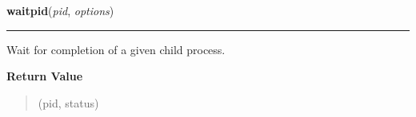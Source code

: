 \hspace{.8\funcindent}\begin{boxedminipage}{\funcwidth}

    \raggedright \textbf{waitpid}(\textit{pid}, \textit{options})

    \vspace{-1.5ex}

    \rule{\textwidth}{0.5\fboxrule}
\setlength{\parskip}{2ex}
    Wait for completion of a given child process.

\setlength{\parskip}{1ex}
      \textbf{Return Value}
    \vspace{-1ex}

      \begin{quote}
      (pid, status)

      \end{quote}

    \end{boxedminipage}

    \label{os:walk}

    \vspace{0.5ex}

